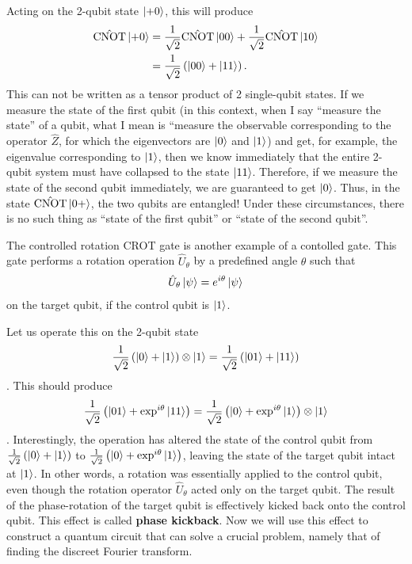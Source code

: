 \documentclass[12pt,oneside]{book}
\begin{document}
Acting on the 2-qubit state $\ket{+0}$, this will produce
\begin{align*}
    \hat{\mathrm{CNOT}} \ket{+0} &{}= \frac{1}{\sqrt{2}} \hat{\mathrm{CNOT}} \ket{00} + \frac{1}{\sqrt{2}} \hat{\mathrm{CNOT}} \ket{10}\\
    &{}= \frac{1}{\sqrt{2}} \left(\ket{00}+\ket{11}\right).
\end{align*}
This can not be written as a tensor product of 2 single-qubit states. If we measure the state of the first qubit (in this context, when I say ``measure the state'' of a qubit, what I mean is ``measure the observable corresponding to the operator $\hat{Z}$, for which the eigenvectors are $\ket{0}$ and $\ket{1}$) and get, for example, the eigenvalue corresponding to $\ket{1}$, then we know immediately that the entire 2-qubit system must have collapsed to the state $\ket{11}$. Therefore, if we measure the state of the second qubit immediately, we are guaranteed to get $\ket{0}$. Thus, in the state $\hat{\mathrm{CNOT}}\ket{0+}$, the two qubits are entangled! Under these circumstances, there is no such thing as ``state of the first qubit'' or ``state of the second qubit''.

The controlled rotation CROT gate is another example of a contolled gate. This gate performs a rotation operation $\hat{U}_\theta$ by a predefined angle $\theta$ such that
\begin{align*}   \hat{U}_\theta\ket{\psi}=e^{i\theta}\ket{\psi}
\end{align*}
on the target qubit, if the control qubit is $\ket{1}$.

Let us operate this on the 2-qubit state $$\frac{1}{\sqrt{2}}\left(\ket{0}+\ket{1}\right)\otimes\ket{1} = \frac{1}{\sqrt{2}}\left(\ket{01}+\ket{11}\right)$$. This should produce
\begin{align*}
    \frac{1}{\sqrt{2}}\left(\ket{01}+\exp^{i\theta}\ket{11}\right) = \frac{1}{\sqrt{2}} \left(\ket{0}+\exp^{i\theta}\ket{1}\right)\otimes\ket{1}
\end{align*}.
Interestingly, the operation has altered the state of the control qubit from $\frac{1}{\sqrt{2}}\left(\ket{0}+\ket{1}\right)$ to $\frac{1}{\sqrt{2}}\left(\ket{0}+\exp^{i\theta}\ket{1}\right)$, leaving the state of the target qubit intact at $\ket{1}$. In other words, a rotation was essentially applied to the control qubit, even though the rotation operator $\hat{U}_\theta$ acted only on the target qubit. The result of the phase-rotation of the target qubit is effectively kicked back onto the control qubit. This effect is called \textbf{phase kickback}.
Now we will use this effect to construct a quantum circuit that can solve a crucial problem, namely that of finding the discreet Fourier transform.
\end{document}
